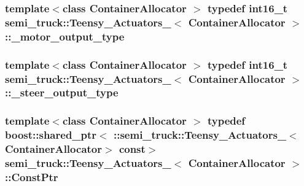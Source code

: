 \subsubsection[{\texorpdfstring{\+\_\+motor\+\_\+output\+\_\+type}{_motor_output_type}}]{\setlength{\rightskip}{0pt plus 5cm}template$<$class Container\+Allocator $>$ typedef int16\+\_\+t {\bf semi\+\_\+truck\+::\+Teensy\+\_\+\+Actuators\+\_\+}$<$ Container\+Allocator $>$\+::{\bf \+\_\+motor\+\_\+output\+\_\+type}}\hypertarget{structsemi__truck_1_1_teensy___actuators___a1cefa1e8e0f45e76b2f6322407c74ab1}{}\label{structsemi__truck_1_1_teensy___actuators___a1cefa1e8e0f45e76b2f6322407c74ab1}
\subsubsection[{\texorpdfstring{\+\_\+steer\+\_\+output\+\_\+type}{_steer_output_type}}]{\setlength{\rightskip}{0pt plus 5cm}template$<$class Container\+Allocator $>$ typedef int16\+\_\+t {\bf semi\+\_\+truck\+::\+Teensy\+\_\+\+Actuators\+\_\+}$<$ Container\+Allocator $>$\+::{\bf \+\_\+steer\+\_\+output\+\_\+type}}\hypertarget{structsemi__truck_1_1_teensy___actuators___a38b3265a1e0521620575f2cdcec23d1a}{}\label{structsemi__truck_1_1_teensy___actuators___a38b3265a1e0521620575f2cdcec23d1a}
\subsubsection[{\texorpdfstring{Const\+Ptr}{ConstPtr}}]{\setlength{\rightskip}{0pt plus 5cm}template$<$class Container\+Allocator $>$ typedef boost\+::shared\+\_\+ptr$<$ \+::{\bf semi\+\_\+truck\+::\+Teensy\+\_\+\+Actuators\+\_\+}$<$Container\+Allocator$>$ const$>$ {\bf semi\+\_\+truck\+::\+Teensy\+\_\+\+Actuators\+\_\+}$<$ Container\+Allocator $>$\+::{\bf Const\+Ptr}}\hypertarget{structsemi__truck_1_1_teensy___actuators___a7a0d58ea72ee326dfe3e3476ae6ef61f}{}\label{structsemi__truck_1_1_teensy___actuators___a7a0d58ea72ee326dfe3e3476ae6ef61f}
